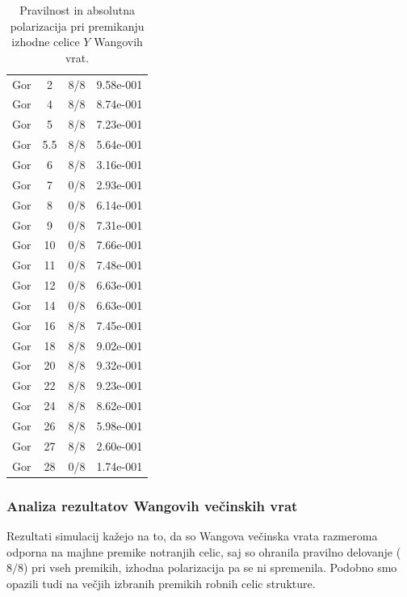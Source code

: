 \documentclass[12pt,a4paper]{article}
\begin{document}
\begin{table}[H]
\begin{minipage}{0.49\textwidth}
{\begin{tabular}{|c|c|c|c|}
                \hline
                Gor & 2 & 8/8 & 9.58e-001 \\
                Gor & 4 & 8/8 & 8.74e-001 \\
                Gor & 5 & 8/8 & 7.23e-001 \\
                Gor & 5.5 & 8/8 & 5.64e-001 \\
                Gor & 6 & 8/8 & 3.16e-001 \\
                Gor & 7 & 0/8 & 2.93e-001 \\
                Gor & 8 & 0/8 & 6.14e-001 \\
                Gor & 9 & 0/8 & 7.31e-001 \\
                Gor & 10 & 0/8 & 7.66e-001 \\
                Gor & 11 & 0/8 & 7.48e-001 \\
                Gor & 12 & 0/8 & 6.63e-001 \\
                Gor & 14 & 0/8 & 6.63e-001 \\
                Gor & 16 & 8/8 & 7.45e-001 \\
                Gor & 18 & 8/8 & 9.02e-001 \\
                Gor & 20 & 8/8 & 9.32e-001 \\
                Gor & 22 & 8/8 & 9.23e-001 \\
                Gor & 24 & 8/8 & 8.62e-001 \\
                Gor & 26 & 8/8 & 5.98e-001 \\
                Gor & 27 & 8/8 & 2.60e-001 \\
                Gor & 28 & 0/8 & 1.74e-001 \\
                \hline
            \end{tabular}
        }
    \end{minipage}
    \caption{Pravilnost in absolutna polarizacija pri premikanju izhodne celice $Y$ Wangovih vrat.}
    \label{g18:tab:wang-izhod}
\end{table}


\subsubsection{Analiza rezultatov Wangovih večinskih vrat}
\label{g18:sec:rez-wang-analiza}

Rezultati simulacij kažejo na to, da so Wangova večinska vrata razmeroma odporna na majhne premike notranjih celic, saj so ohranila pravilno delovanje ($8/8$) pri vseh premikih, izhodna polarizacija pa se ni spremenila. 
Podobno smo opazili tudi na večjih izbranih premikih robnih celic strukture.
\end{document}
